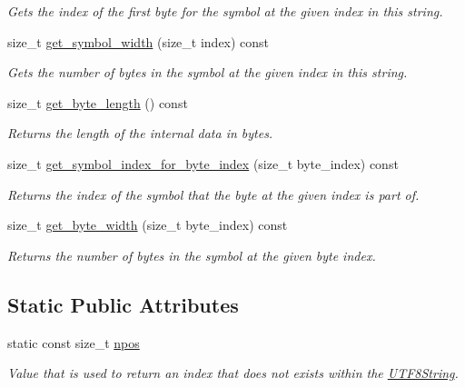 \begin{DoxyCompactItemize}
\begin{DoxyCompactList}\small\item\em Gets the index of the first byte for the symbol at the given index in this string. \end{DoxyCompactList}\item 
size\+\_\+t \hyperlink{classchaos_1_1str_1_1_u_t_f8_string_a0c54a7cfaf4a3c1881b0c933c49a4922}{get\+\_\+symbol\+\_\+width} (size\+\_\+t index) const 
\begin{DoxyCompactList}\small\item\em Gets the number of bytes in the symbol at the given index in this string. \end{DoxyCompactList}\item 
size\+\_\+t \hyperlink{classchaos_1_1str_1_1_u_t_f8_string_a9312a6aac333d68a87066d6f222d119a}{get\+\_\+byte\+\_\+length} () const 
\begin{DoxyCompactList}\small\item\em Returns the length of the internal data in bytes. \end{DoxyCompactList}\item 
size\+\_\+t \hyperlink{classchaos_1_1str_1_1_u_t_f8_string_aa005c8b0243343ec7308d00fa6e72846}{get\+\_\+symbol\+\_\+index\+\_\+for\+\_\+byte\+\_\+index} (size\+\_\+t byte\+\_\+index) const 
\begin{DoxyCompactList}\small\item\em Returns the index of the symbol that the byte at the given index is part of. \end{DoxyCompactList}\item 
size\+\_\+t \hyperlink{classchaos_1_1str_1_1_u_t_f8_string_a387abdce2189a379961844cd0a42a97a}{get\+\_\+byte\+\_\+width} (size\+\_\+t byte\+\_\+index) const 
\begin{DoxyCompactList}\small\item\em Returns the number of bytes in the symbol at the given byte index. \end{DoxyCompactList}\end{DoxyCompactItemize}
\subsection*{Static Public Attributes}
\begin{DoxyCompactItemize}
\item 
\hypertarget{classchaos_1_1str_1_1_u_t_f8_string_a7e301ebfad4cd1b14e3a13cb0595b43b}{}static const size\+\_\+t \hyperlink{classchaos_1_1str_1_1_u_t_f8_string_a7e301ebfad4cd1b14e3a13cb0595b43b}{npos}\label{classchaos_1_1str_1_1_u_t_f8_string_a7e301ebfad4cd1b14e3a13cb0595b43b}

\begin{DoxyCompactList}\small\item\em Value that is used to return an index that does not exists within the \hyperlink{classchaos_1_1str_1_1_u_t_f8_string}{U\+T\+F8\+String}. \end{DoxyCompactList}\end{DoxyCompactItemize}


